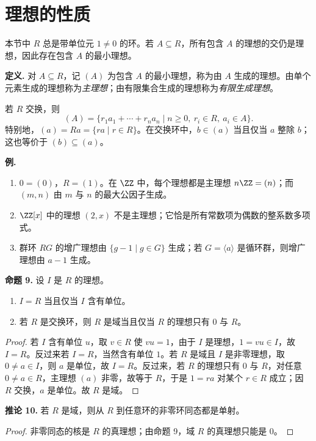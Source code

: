 \section{理想的性质}

本节中 $R$ 总是带单位元 $1\neq0$ 的环。若 $A\subseteq R$，所有包含 $A$ 的理想的交仍是理想，因此存在包含 $A$ 的最小理想。

\medskip
\noindent\textbf{定义.} 对 $A\subseteq R$，记 $(A)$ 为包含 $A$ 的最小理想，称为由 $A$ 生成的理想。由单个元素生成的理想称为\emph{主理想}；由有限集合生成的理想称为\emph{有限生成理想}。

若 $R$ 交换，则
\[
  (A)=\{r_1a_1+\cdots+r_na_n\mid n\geq0,
  \ r_i\in R,
  \ a_i\in A\}.
\]
特别地，$(a)=Ra=\{ra\mid r\in R\}$。在交换环中，$b\in(a)$ 当且仅当 $a$ 整除 $b$；这也等价于 $(b)\subseteq(a)$。

\medskip
\noindent\textbf{例.}
\begin{enumerate}[label=(\arabic*)]
  \item $0=(0)$，$R=(1)$。在 $\ZZ$ 中，每个理想都是主理想 $n\ZZ=(n)$；而 $(m,n)$ 由 $m$ 与 $n$ 的最大公因子生成。
  \item $\ZZ[x]$ 中的理想 $(2,x)$ 不是主理想；它恰是所有常数项为偶数的整系数多项式。
  \item 群环 $RG$ 的增广理想由 $\{g-1\mid g\in G\}$ 生成；若 $G=\langle a\rangle$ 是循环群，则增广理想由 $a-1$ 生成。
\end{enumerate}

\medskip
\noindent\textbf{命题 9.} 设 $I$ 是 $R$ 的理想。
\begin{enumerate}[label=(\arabic*)]
  \item $I=R$ 当且仅当 $I$ 含有单位。
  \item 若 $R$ 是交换环，则 $R$ 是域当且仅当 $R$ 的理想只有 $0$ 与 $R$。
\end{enumerate}

\begin{proof}
若 $I$ 含有单位 $u$，取 $v\in R$ 使 $vu=1$，由于 $I$ 是理想，$1=vu\in I$，故 $I=R$。反过来若 $I=R$，当然含有单位 $1$。若 $R$ 是域且 $I$ 是非零理想，取 $0\neq a\in I$，则 $a$ 是单位，故 $I=R$。反过来，若 $R$ 的理想只有 $0$ 与 $R$，对任意 $0\neq a\in R$，主理想 $(a)$ 非零，故等于 $R$，于是 $1=ra$ 对某个 $r\in R$ 成立；因 $R$ 交换，$a$ 是单位。故 $R$ 是域。
\end{proof}

\medskip
\noindent\textbf{推论 10.} 若 $R$ 是域，则从 $R$ 到任意环的非零环同态都是单射。

\begin{proof}
非零同态的核是 $R$ 的真理想；由命题 9，域 $R$ 的真理想只能是 $0$。
\end{proof}

